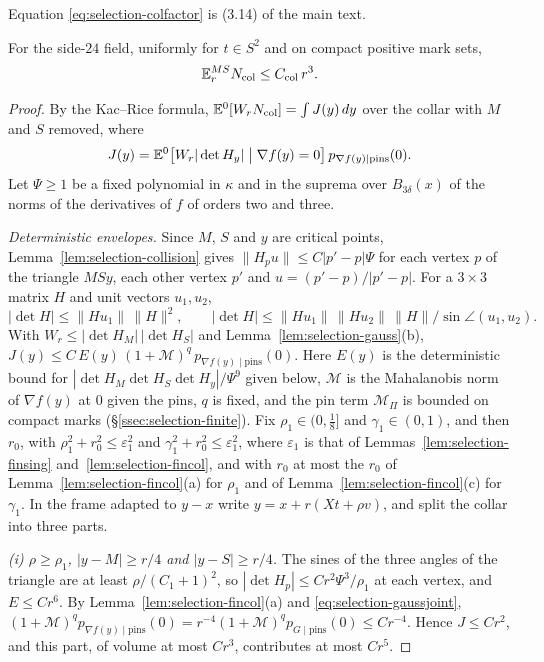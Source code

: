 Equation \eqref{eq:selection-colfactor} is (3.14) of the main text.

\begin{lemma}\label{lem:selection-collar}
For the side-$24$ field, uniformly for $t\in S^2$ and on compact positive mark sets,
\begin{equation}\label{eq:selection-colcount}
\mathbb E^{MS}_rN_{\rm col}\le C_{\rm col}\,r^3 .
\end{equation}
\end{lemma}

\begin{proof}
By the Kac--Rice formula, $\mathbb E^0[W_rN_{\rm col}]=\int J(y)\,dy$ over the collar with $M$ and $S$ removed, where
\[
J(y)=\mathbb E^0\bigl[W_r|\det H_y|\bigm|\nabla f(y)=0\bigr]\,p_{\nabla f(y)\mid\text{pins}}(0).
\]
Let $\Psi\ge1$ be a fixed polynomial in $\kappa$ and in the suprema over $B_{3\delta}(x)$ of the norms of the derivatives of $f$ of orders two and three.

\emph{Deterministic envelopes.} Since $M$, $S$ and $y$ are critical points, Lemma~\ref{lem:selection-collision} gives $\|H_pu\|\le C|p'-p|\Psi$ for each vertex $p$ of the triangle $MSy$, each other vertex $p'$ and $u=(p'-p)/|p'-p|$. For a $3\times3$ matrix $H$ and unit vectors $u_1,u_2$,
\[
|\det H|\le\|Hu_1\|\,\|H\|^2,\qquad|\det H|\le\|Hu_1\|\,\|Hu_2\|\,\|H\|/\sin\angle(u_1,u_2).
\]
With $W_r\le|\det H_M|\,|\det H_S|$ and Lemma~\ref{lem:selection-gauss}(b), $J(y)\le C\,E(y)\,(1+\mathcal M)^q\,p_{\nabla f(y)\mid\text{pins}}(0)$. Here $E(y)$ is the deterministic bound for $|\det H_M\det H_S\det H_y|/\Psi^9$ given below, $\mathcal M$ is the Mahalanobis norm of $\nabla f(y)$ at $0$ given the pins, $q$ is fixed, and the pin term $\mathcal M_\Pi$ is bounded on compact marks (\S\ref{ssec:selection-finite}). Fix $\rho_1\in(0,\frac18]$ and $\gamma_1\in(0,1)$, and then $r_0$, with $\rho_1^2+r_0^2\le\varepsilon_1^2$ and $\gamma_1^2+r_0^2\le\varepsilon_1^2$, where $\varepsilon_1$ is that of Lemmas~\ref{lem:selection-finsing} and~\ref{lem:selection-fincol}, and with $r_0$ at most the $r_0$ of Lemma~\ref{lem:selection-fincol}(a) for $\rho_1$ and of Lemma~\ref{lem:selection-fincol}(c) for $\gamma_1$. In the frame adapted to $y-x$ write $y=x+r(Xt+\rho v)$, and split the collar into three parts.

\emph{(i) $\rho\ge\rho_1$, $|y-M|\ge r/4$ and $|y-S|\ge r/4$.} The sines of the three angles of the triangle are at least $\rho/(C_1+1)^2$, so $|\det H_p|\le Cr^2\Psi^3/\rho_1$ at each vertex, and $E\le Cr^6$. By Lemma~\ref{lem:selection-fincol}(a) and \eqref{eq:selection-gaussjoint}, $(1+\mathcal M)^qp_{\nabla f(y)\mid\text{pins}}(0)=r^{-4}(1+\mathcal M)^qp_{G\mid\text{pins}}(0)\le Cr^{-4}$. Hence $J\le Cr^2$, and this part, of volume at most $Cr^3$, contributes at most $Cr^5$.


\end{proof}
